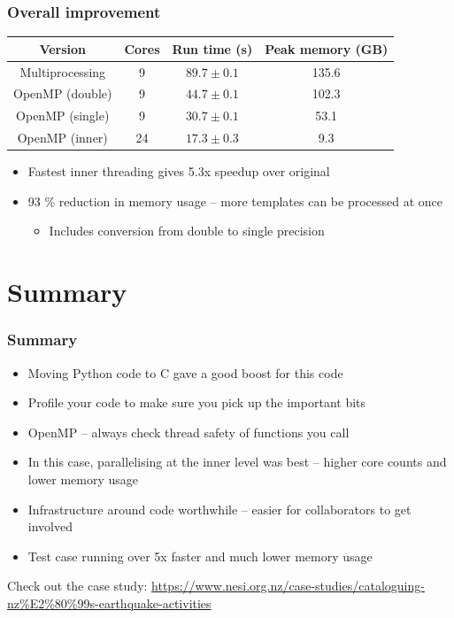 \documentclass[aspectratio=169]{beamer}
\begin{document}
\begin{frame}
    \frametitle{Overall improvement}

    \begin{table}[]
        \centering
        \begin{tabular}{c|c|c|c}
            Version & Cores & Run time (s) & Peak memory (GB) \\ \hline
            Multiprocessing & 9 & $89.7 \pm 0.1$ & 135.6 \\
            OpenMP (double) & 9 & $44.7 \pm 0.1$ & 102.3 \\
            OpenMP (single) & 9 & $30.7 \pm 0.1$ & 53.1 \\
            OpenMP (inner) & 24 & $17.3 \pm 0.3$ & 9.3 \\
        \end{tabular}
    \end{table}
    
    \begin{itemize}
        \item Fastest inner threading gives 5.3x speedup over original
        \item 93 \% reduction in memory usage -- more templates can be processed at once
            \begin{itemize}
                \item Includes conversion from double to single precision
            \end{itemize}
    \end{itemize}


\end{frame}

\section{Summary}

\begin{frame}
    \frametitle{Summary}
    
    \begin{itemize}
      \item Moving Python code to C gave a good boost for this code
      \item Profile your code to make sure you pick up the important bits
      \item OpenMP -- always check thread safety of functions you call
      \item In this case, parallelising at the inner level was best -- higher core counts and lower memory usage
      \item Infrastructure around code worthwhile -- easier for collaborators to get involved
      \item Test case running over 5x faster and much lower memory usage
    \end{itemize}
    
    Check out the case study:
    \url{https://www.nesi.org.nz/case-studies/cataloguing-nz\%E2\%80\%99s-earthquake-activities}

\end{frame}
\end{document}
